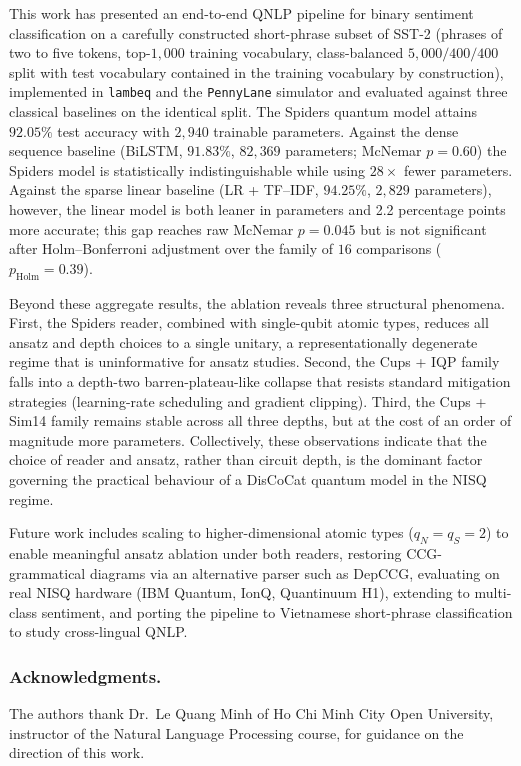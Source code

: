\documentclass[runningheads]{llncs}
\begin{document}
This work has presented an end-to-end QNLP pipeline for binary
sentiment classification on a carefully constructed short-phrase
subset of SST-2 (phrases of two to five tokens, top-\(1{,}000\)
training vocabulary, class-balanced \(5{,}000/400/400\) split with
test vocabulary contained in the training vocabulary by construction),
implemented in \texttt{lambeq} and the \texttt{PennyLane} simulator
and evaluated against three classical baselines on the identical
split. The Spiders quantum model attains \(92.05\%\) test accuracy
with \(2{,}940\) trainable parameters. Against the dense sequence
baseline (BiLSTM, \(91.83\%\), \(82{,}369\) parameters; McNemar
\(p = 0.60\)) the Spiders model is statistically indistinguishable
while using \(28\times\) fewer parameters. Against the sparse linear
baseline (LR + TF--IDF, \(94.25\%\), \(2{,}829\) parameters),
however, the linear model is both leaner in parameters and
2.2 percentage points more accurate; this gap reaches raw McNemar
\(p = 0.045\) but is not significant after Holm--Bonferroni
adjustment over the family of \(16\) comparisons
(\(p_{\text{Holm}} = 0.39\)).

Beyond these aggregate results, the ablation reveals three
structural phenomena. First, the Spiders reader, combined with
single-qubit atomic types, reduces all ansatz and depth choices to
a single unitary, a representationally degenerate regime that is
uninformative for ansatz studies. Second, the Cups + IQP family
falls into a depth-two barren-plateau-like collapse that resists standard
mitigation strategies (learning-rate scheduling and gradient
clipping). Third, the Cups + Sim14 family remains stable across
all three depths, but at the cost of an order of magnitude more
parameters. Collectively, these observations indicate that the
choice of reader and ansatz, rather than circuit depth, is the
dominant factor governing the practical behaviour of a DisCoCat
quantum model in the NISQ regime.

Future work includes scaling to higher-dimensional atomic types
(\(q_N=q_S=2\)) to enable meaningful ansatz ablation under both readers,
restoring CCG-grammatical diagrams via an alternative parser such as
DepCCG, evaluating on real NISQ hardware (IBM Quantum, IonQ, Quantinuum H1),
extending to multi-class sentiment, and porting the pipeline to Vietnamese
short-phrase classification to study cross-lingual QNLP.

\subsubsection*{Acknowledgments.} The authors thank Dr.\ Le Quang Minh
of Ho Chi Minh City Open University, instructor of the Natural
Language Processing course, for guidance on the direction of this
work.
\end{document}
